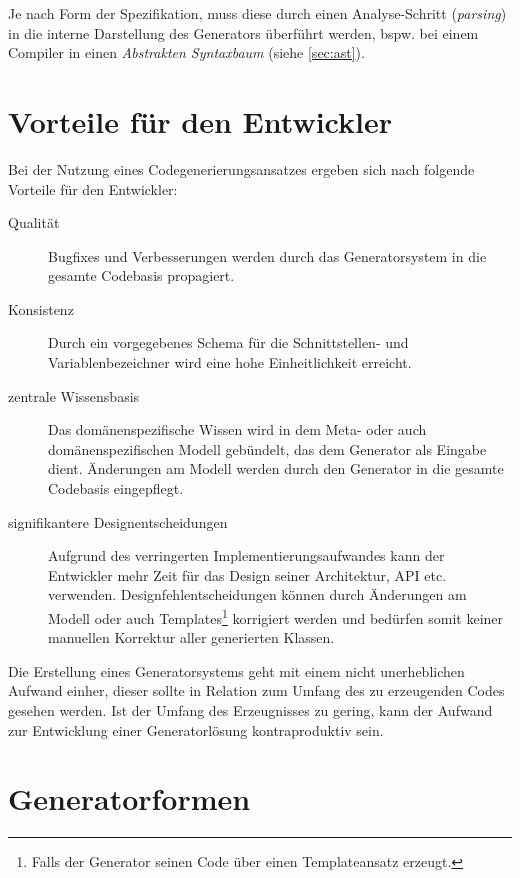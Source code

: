 Je nach Form der Spezifikation, muss diese durch einen Analyse-Schritt (\emph{parsing}) in die interne Darstellung des Generators überführt werden, bspw. bei einem Compiler in einen \emph{Abstrakten Syntaxbaum} (siehe \cref{sec:ast}).

\section{Vorteile für den Entwickler}
\label{sec:advantages_for_the_developer}

Bei der Nutzung eines Codegenerierungsansatzes ergeben sich nach \cite[][S. 15]{herrington2003code} folgende Vorteile für den Entwickler:

\begin{description}
    \item[Qualität]
        Bugfixes und Verbesserungen werden durch das Generatorsystem in die gesamte Codebasis propagiert.
    \item[Konsistenz]
        Durch ein vorgegebenes Schema für die Schnittstellen- und Variablenbezeichner wird eine hohe Einheitlichkeit erreicht.
    \item[zentrale Wissensbasis]
        Das domänenspezifische Wissen wird in dem Meta- oder auch domänenspezifischen Modell gebündelt, das dem Generator als Eingabe dient. Änderungen am Modell werden durch den Generator in die gesamte Codebasis eingepflegt.
    \item[signifikantere Designentscheidungen]
        Aufgrund des verringerten Implementierungsaufwandes kann der Entwickler mehr Zeit für das Design seiner Architektur, API etc. verwenden. Designfehlentscheidungen können durch Änderungen am Modell oder auch Templates\footnote{Falls der Generator seinen Code über einen Templateansatz erzeugt.} korrigiert werden und bedürfen somit keiner manuellen Korrektur aller generierten Klassen.
\end{description}

Die Erstellung eines Generatorsystems geht mit einem nicht unerheblichen Aufwand einher, dieser sollte in Relation zum Umfang des zu erzeugenden Codes gesehen werden.
Ist der Umfang des Erzeugnisses zu gering, kann der Aufwand zur Entwicklung einer Generatorlösung kontraproduktiv sein.

\section{Generatorformen}
\label{sec:generator_models}

